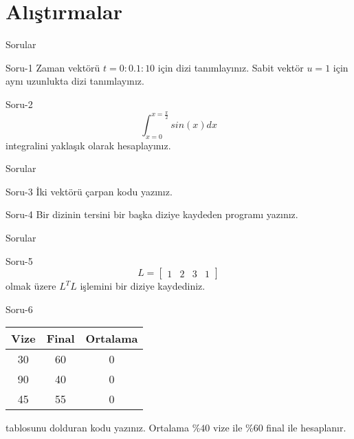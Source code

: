 \section{Alıştırmalar}
\begin{frame}[fragile]{Sorular}
    \begin{alertblock}{Soru-1}
        Zaman vektörü $t=0:0.1:10$ için dizi tanımlayınız.
        Sabit vektör $u=1$ için aynı uzunlukta dizi tanımlayınız.
    \end{alertblock}
    \begin{alertblock}{Soru-2}
        \begin{equation}
            \int_{x=0}^{x=\frac{\pi}{2}}sin(x)dx
        \end{equation}
        integralini yaklaşık olarak hesaplayınız.
    \end{alertblock}
\end{frame}
\begin{frame}[fragile]{Sorular}
    \begin{alertblock}{Soru-3}
        İki vektörü çarpan kodu yazınız.
    \end{alertblock}
    \begin{alertblock}{Soru-4}
        Bir dizinin tersini bir başka diziye kaydeden programı yazınız.
    \end{alertblock}
\end{frame}
\begin{frame}[fragile]{Sorular}
    \begin{alertblock}{Soru-5}
        \begin{equation}
            L=\begin{bmatrix}
                1&2&3&1
            \end{bmatrix}
        \end{equation}
        olmak üzere $L^TL$ işlemini bir diziye kaydediniz.
    \end{alertblock}
    \begin{alertblock}{Soru-6}
        \begin{tabular}{cc|c}\\\hline
            \textbf{Vize}& \textbf{Final}& \textbf{Ortalama}\\\hline
            30& 60& 0\\
            90& 40& 0\\
            45& 55& 0\\\hline
        \end{tabular}
        tablosunu dolduran kodu yazınız. Ortalama $\%40$ vize ile $\%60$ final ile hesaplanır.
    \end{alertblock}
\end{frame}
